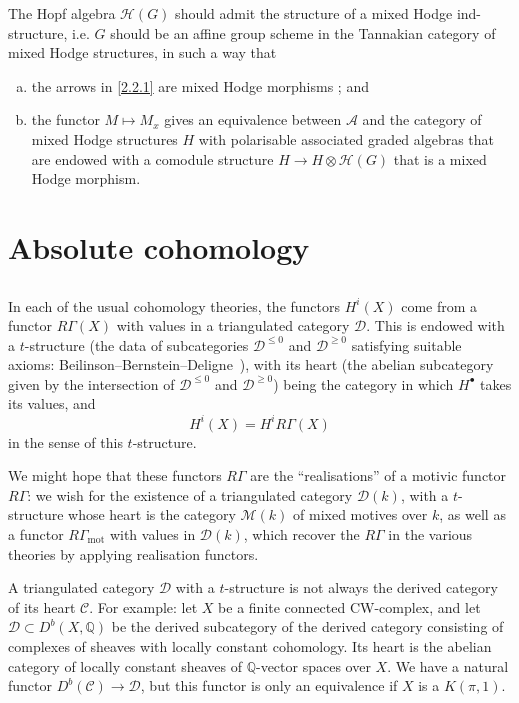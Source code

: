 \documentclass{article}
\theoremstyle{plain}
\theoremstyle{definition}
\newcommand{\sh}{\mathscr}
\newcommand{\QQ}{\mathbb{Q}}
\newcommand{\mot}{\mathrm{mot}}
\renewcommand{\geq}{\geqslant}
\renewcommand{\leq}{\leqslant}
\begin{document}
The Hopf algebra $\sh{H}(G)$ should admit the structure of a mixed Hodge ind-structure, i.e. $G$ should be an affine group scheme in the Tannakian category of mixed Hodge structures, in such a way that
\begin{enumerate}[(a)]
  \item the arrows in \cref{2.2.1} are mixed Hodge morphisms ; and
  \item the functor $M\mapsto M_x$ gives an equivalence between $\sh{A}$ and the category of mixed Hodge structures $H$ with polarisable associated graded algebras that are endowed with a comodule structure $H\to H\otimes\sh{H}(G)$ that is a mixed Hodge morphism.
\end{enumerate}


\section{Absolute cohomology}
\label{3}

\subsection{}
\label{3.1}

In each of the usual cohomology theories, the functors $H^i(X)$ come from a functor $R\Gamma(X)$ with values in a triangulated category $\sh{D}$.
This is endowed with a $t$-structure (the data of subcategories $\sh{D}^{\leq0}$ and $\sh{D}^{\geq0}$ satisfying suitable axioms: Beilinson--Bernstein--Deligne~\cite[1.3]{3}), with its heart (the abelian subcategory given by the intersection of $\sh{D}^{\leq0}$ and $\sh{D}^{\geq0}$) being the category in which $H^\bullet$ takes its values, and
\[
  H^i(X) = H^iR\Gamma(X)
\]
in the sense of this $t$-structure.

We might hope that these functors $R\Gamma$ are the ``realisations'' of a motivic functor $R\Gamma$:
we wish for the existence of a triangulated category $\sh{D}(k)$, with a $t$-structure whose heart is the category $\sh{M}(k)$ of mixed motives over $k$, as well as a functor $R\Gamma_\mot$ with values in $\sh{D}(k)$, which recover the $R\Gamma$ in the various theories by applying realisation functors.

A triangulated category $\sh{D}$ with a $t$-structure is not always the derived category of its heart $\sh{C}$.
For example: let $X$ be a finite connected CW-complex, and let $\sh{D}\subset D^b(X,\QQ)$ be the derived subcategory of the derived category consisting of complexes of sheaves with locally constant cohomology.
Its heart is the abelian category of locally constant sheaves of $\QQ$-vector spaces over $X$.
We have a natural functor $D^b(\sh{C})\to\sh{D}$, but this functor is only an equivalence if $X$ is a $K(\pi,1)$.
\end{document}
